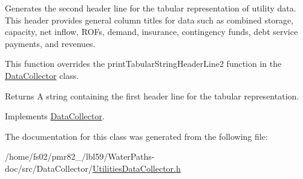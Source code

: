 Generates the second header line for the tabular representation of utility data. This header provides general column titles for data such as combined storage, capacity, net inflow, R\+O\+Fs, demand, insurance, contingency funds, debt service payments, and revenues. 

This function overrides the {\ttfamily print\+Tabular\+String\+Header\+Line2} function in the {\ttfamily \mbox{\hyperlink{classDataCollector}{Data\+Collector}}} class.

\begin{DoxyReturn}{Returns}
A string containing the first header line for the tabular representation. 
\end{DoxyReturn}


Implements \mbox{\hyperlink{classDataCollector_af01ea961314be2164f39e6d4cd59e443}{Data\+Collector}}.



The documentation for this class was generated from the following file\+:\begin{DoxyCompactItemize}
\item 
/home/fs02/pmr82\+\_/lbl59/\+Water\+Paths-\/doc/src/\+Data\+Collector/\mbox{\hyperlink{UtilitiesDataCollector_8h}{Utilities\+Data\+Collector.\+h}}\end{DoxyCompactItemize}
